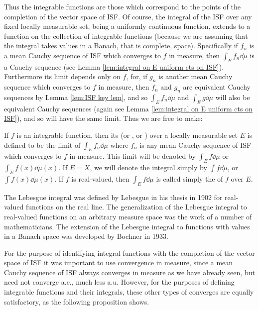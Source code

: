 Thus the integrable functions are those which correspond to the points of the completion of the vector space of ISF. Of course, the integral of the ISF over any fixed locally measurable set, being a uniformly continuous function, extends to a function on the collection of integrable functions (because we are assuming that the integral takes values in a Banach, that is complete, space). Specifically if $f_n$ is a mean Cauchy sequence of ISF which converges to $f$ in measure, then $\int_Ef_n\dd\mu$ is a Cauchy sequence (see Lemma \ref{lem:integral on E uniform cts on ISF}). Furthermore its limit depends only on $f$, for, if $g_n$ is another mean Cauchy sequence which converges to $f$ in measure, then $f_n$ and $g_n$ are equivalent Cauchy sequences by Lemma \ref{lem:ISF key lem}, and so $\int_Ef_n\dd\mu$ and $\int_Eg\dd\mu$ will also be equivalent Cauchy sequences (again see Lemma \ref{lem:integral on E uniform cts on ISF}), and so will have the same limit. Thus we are free to make:

\begin{definition}
If $f$ is an integrable function, then its  (or , or ) over a locally measurable set $E$ is defined to be the limit of $\int_Ef_n\dd\mu$ where $f_n$ is any mean Cauchy sequence of ISF which converges to $f$ in measure. This limit will be denoted by $\int_Ef\dd\mu$ or $\int_Ef(x)\dd\mu(x)$. If $E=X$, we will denote the integral simply by $\int f\dd\mu$, or $\int f(x)\dd\mu(x)$. If $f$ is real-valued, then $\int_Ef\dd\mu$ is called simply the  of $f$ over $E$.
\end{definition}

The Lebesgue integral was defined by Lebesgue in his thesis in 1902 for real-valued functions on the real line. The generalization of the Lebesgue integral to real-valued functions on an arbitrary measure space was the work of a number of mathematicians. The extension of the Lebesgue integral to functions with values in a Banach space was developed by Bochner in 1933.

For the purpose of identifying integral functions with the completion of the vector space of ISF it was important to use convergence in measure, since a mean Cauchy sequence of ISF always converges in measure as we have already seen, but need not converge a.e., much less a.u. However, for the purposes of defining integrable functions and their integrals, these other types of converges are equally satisfactory, as the following proposition shows.

